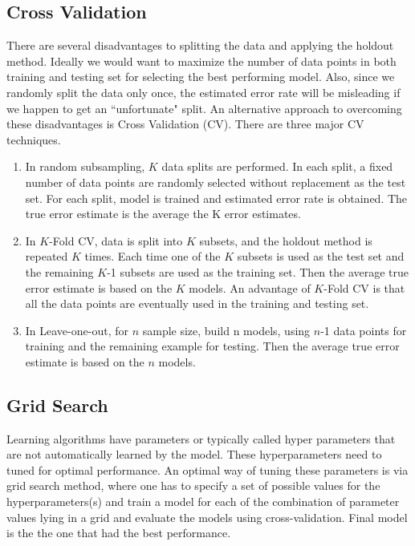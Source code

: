 \documentclass[12pt, letterpaper]{article}
\begin{document}
\subsection{Cross Validation}

There are several disadvantages to splitting the data and applying the holdout method. Ideally we would want to maximize the number of data points in both training and testing set for selecting the best performing model. Also, since we randomly split the data only once, the estimated error rate will be misleading if we happen to get an ``unfortunate" split. An alternative approach to overcoming these disadvantages is Cross Validation (CV). There are three major CV techniques. 

\begin{enumerate}
\item In random subsampling, $K$ data splits are performed. In each split, a fixed number of data points are randomly selected without replacement as the test set. For each split, model is trained and estimated error rate is obtained. The true error estimate is the average the K error estimates.
\item In $K$-Fold CV, data is split into $K$ subsets, and the holdout method is repeated $K$ times. Each time one of the $K$ subsets is used as the test set and the remaining $K$-1 subsets are used as the training set. Then the average true error estimate is based on the $K$ models. An advantage of $K$-Fold CV is that all the data points are eventually used in the training and testing set.  
\item In Leave-one-out, for $n$ sample size, build n models, using $n$-1 data points for training and the remaining example for testing. Then the average true error estimate is based on the $n$ models.
\end{enumerate}

\subsection{Grid Search}

Learning algorithms have parameters or typically called hyper parameters that are not automatically learned by the model. These hyperparameters need to tuned for optimal performance. An optimal way of tuning these parameters is via grid search method, where one has to specify a set of possible values for the hyperparameters(s) and train a model for each of the combination of parameter values lying in a grid and evaluate the models using cross-validation. Final model is the the one that had the best performance. 
\end{document}
